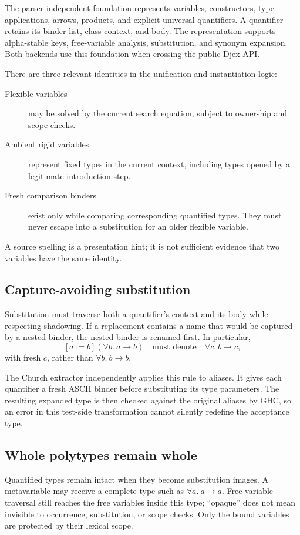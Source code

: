 \documentclass[11pt]{article}
\begin{document}
The parser-independent foundation represents variables, constructors, type
applications, arrows, products, and explicit universal quantifiers. A
quantifier retains its binder list, class context, and body. The representation
supports alpha-stable keys, free-variable analysis, substitution, and
synonym expansion. Both backends use this foundation when crossing the public
Djex API.

There are three relevant identities in the unification and instantiation
logic:
\begin{description}
  \item[Flexible variables] may be solved by the current search equation,
    subject to ownership and scope checks.
  \item[Ambient rigid variables] represent fixed types in the current
    context, including types opened by a legitimate introduction step.
  \item[Fresh comparison binders] exist only while comparing corresponding
    quantified types. They must never escape into a substitution for an older
    flexible variable.
\end{description}
A source spelling is a presentation hint; it is not sufficient evidence that
two variables have the same identity.

\subsection{Capture-avoiding substitution}

Substitution must traverse both a quantifier's context and its body while
respecting shadowing. If a replacement contains a name that would be captured
by a nested binder, the nested binder is renamed first. In particular,
\[
  [a := b](\forall b.\ a \to b)
  \quad\text{must denote}\quad
  \forall c.\ b \to c,
\]
with fresh $c$, rather than $\forall b.\ b \to b$.

The Church extractor independently applies this rule to aliases. It gives
each quantifier a fresh ASCII binder before substituting its type parameters.
The resulting expanded type is then checked against the original aliases by
GHC, so an error in this test-side transformation cannot silently redefine the
acceptance type.

\subsection{Whole polytypes remain whole}

Quantified types remain intact when they become substitution images. A
metavariable may receive a complete type such as $\forall a.\ a \to a$.
Free-variable traversal still reaches the free variables inside this type;
``opaque'' does not mean invisible to occurrence, substitution, or scope
checks. Only the bound variables are protected by their lexical scope.
\end{document}
